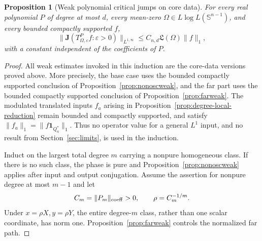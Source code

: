 \documentclass[11pt]{article}
\numberwithin{equation}{section}
\newtheorem{proposition}[theorem]{Proposition}
\theoremstyle{remark}
\theoremstyle{definition}
\newcommand{\Sph}{\mathbb S}
\newcommand{\norm}[1]{\lVert #1\rVert}
\begin{document}
\begin{proposition}[Weak polynomial critical jumps on core data]
\label{prop:weak-polynomial-jump}
For every real polynomial $P$ of degree at most $d$, every mean-zero
$\Omega\in L\log L(\Sph^{n-1})$, and every bounded compactly supported
$f$,
\[
 \norm{\mathbf J(T^P_{\Omega,\varepsilon}f:\varepsilon>0)}_{L^{1,\infty}}
 \le C_{n,d}\mathfrak L(\Omega)\norm f_1,
\]
with a constant independent of the coefficients of $P$.
\end{proposition}

\begin{proof}
All weak estimates invoked in this induction are the core-data versions
proved above.  More precisely, the base case uses the bounded compactly
supported conclusion of Proposition~\ref{prop:nonoscweak}, and the far
part uses the bounded compactly supported conclusion of
Proposition~\ref{prop:farweak}.  The modulated translated inputs $f_a$
arising in Proposition~\ref{prop:degree-local-reduction} remain bounded
and compactly supported, and satisfy
$\norm{f_a}_1=\norm{f\mathbf1_{Q_a^*}}_1$.  Thus no
operator value for a general $L^1$ input, and no result from
Section~\ref{sec:limits}, is used in the induction.

Induct on the largest total degree $m$ carrying a nonpure homogeneous
class.  If there is no such class, the phase is pure and
Proposition~\ref{prop:nonoscweak} applies after input and output
conjugation.  Assume the assertion for nonpure degree at most $m-1$ and
let
\[
 C_m=\norm{P_m}_{\rm coeff}>0,
 \qquad \rho=C_m^{-1/m}.
\]
Under $x=\rho X,y=\rho Y$, the entire degree-$m$ class, rather than one
scalar coordinate, has norm one.  Proposition~\ref{prop:farweak} controls
the normalized far path.


\end{proof}
\end{document}
